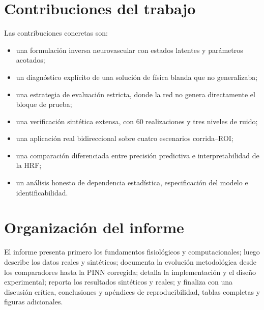 \section{Contribuciones del trabajo}
Las contribuciones concretas son:
\begin{itemize}
  \item una formulación inversa neurovascular con estados latentes y parámetros acotados;
  \item un diagnóstico explícito de una solución de física blanda que no generalizaba;
  \item una estrategia de evaluación estricta, donde la red no genera directamente el bloque de prueba;
  \item una verificación sintética extensa, con 60 realizaciones y tres niveles de ruido;
  \item una aplicación real bidireccional sobre cuatro escenarios corrida--ROI;
  \item una comparación diferenciada entre precisión predictiva e interpretabilidad de la HRF;
  \item un análisis honesto de dependencia estadística, especificación del modelo e identificabilidad.
\end{itemize}

\section{Organización del informe}
El informe presenta primero los fundamentos fisiológicos y computacionales; luego describe los datos reales y sintéticos; documenta la evolución metodológica desde los comparadores hasta la PINN corregida; detalla la implementación y el diseño experimental; reporta los resultados sintéticos y reales; y finaliza con una discusión crítica, conclusiones y apéndices de reproducibilidad, tablas completas y figuras adicionales.
